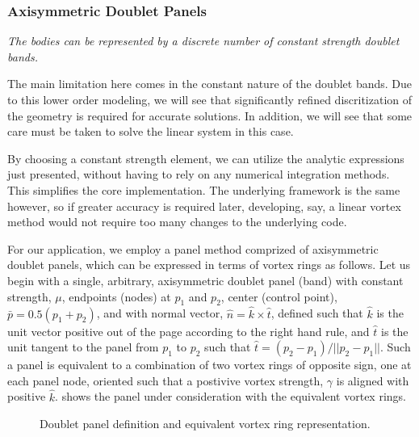 \subsubsection{Axisymmetric Doublet Panels}

\begin{assumption}

    \textit{The bodies can be represented by a discrete number of constant strength doublet bands.}

\smallskip

    \limit The main limitation here comes in the constant nature of the doublet bands.
    Due to this lower order modeling, we will see that significantly refined discritization of the geometry is required for accurate solutions.
    In addition, we will see that some care must be taken to solve the linear system in this case.

\smallskip

    \why By choosing a constant strength element, we can utilize the analytic expressions just presented, without having to rely on any numerical integration methods.
    This simplifies the core implementation.  The underlying framework is the same however, so if greater accuracy is required later, developing, say, a linear vortex method would not require too many changes to the underlying code.

\end{assumption}

For our application, we employ a panel method comprized of axisymmetric doublet panels, which can be expressed in terms of vortex rings as follows.
Let us begin with a single, arbitrary, axisymmetric doublet panel (band)
with constant strength, \(\mu\),
endpoints (nodes) at \(p_1\) and \(p_2\),
center (control point), \(\bar{p}=0.5(p_1+p_2)\),
and with normal vector, \(\hat{n}=\hat{k}\times\hat{t}\),
defined such that \(\hat{k}\) is the unit vector positive out of the page according to the right hand rule,
and \(\hat{t}\) is the unit tangent to the panel from \(p_1\) to \(p_2\)
such that \(\hat{t} = (p_2-p_1)/||p_2-p_1||\).
Such a panel is equivalent to a combination of two vortex rings of opposite sign,
one at each panel node, oriented such that a postivive vortex strength,
\(\gamma\) is aligned with positive \(\hat{k}\).
 shows the panel under consideration with the equivalent vortex rings.

\begin{figure}[h!]
    \centering
    
    \caption{Doublet panel definition and equivalent vortex ring representation.}
    \label{fig:doublet_panel}
\end{figure}

